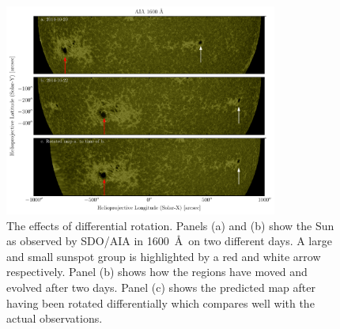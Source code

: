 \begin{figure}
    \center
    \includegraphics[width = 0.8\textwidth]{figures/fig_diff_rot_1600.pdf}
    \caption{The effects of differential rotation.
    Panels (a) and (b) show the Sun as observed by SDO/AIA in 1600~\AA\ on two different days.
    A large and small sunspot group is highlighted by a red and white arrow respectively. Panel (b) shows how the regions have moved and evolved after two days.
    Panel (c) shows the predicted map after having been rotated differentially which compares well with the actual observations.}
    \label{fig:diff_rot}
\end{figure}
